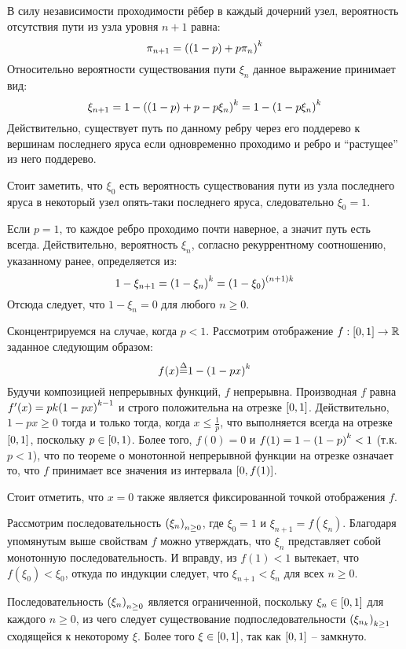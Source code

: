 \documentclass[a4paper]{article}
\let\originalleft\left
\let\originalright\right
\renewcommand{\left}{\mathopen{}\mathclose\bgroup\originalleft}
\renewcommand{\right}{\aftergroup\egroup\originalright}
\newcommand{\clo}[1]{{\left [ #1 \right ]}}
\newcommand{\clop}[1]{{\left [ #1 \right )}}
\newcommand{\brac}[1]{{\left ( #1 \right )}}
\newcommand{\Real}{{\mathbb{R}}}
\newcommand{\defn}{{\mathop{\overset{\Delta}{=}}\nolimits}}
\begin{document}
В силу независимости проходимости рёбер в каждый дочерний узел, вероятность
отсутствия пути из узла уровня $n+1$ равна:
\[ \pi_{n+1} = \brac{ ( 1 - p ) + p \pi_n }^k\]
Относительно вероятности существования пути $\xi_n$ данное выражение принимает
вид:
\[ \xi_{n+1} = 1 - \brac{ ( 1 - p ) + p - p \xi_n }^k = 1 - \brac{ 1 - p \xi_n }^k\]
Действительно, существует путь по данному ребру через его поддерево к вершинам
последнего яруса если одновременно проходимо и ребро и ``растущее'' из него
поддерево.

Стоит заметить, что $\xi_0$ есть вероятность существования пути из узла
последнего яруса в некоторый узел опять-таки последнего яруса, следовательно
$\xi_0 = 1$.

Если $p = 1$, то каждое ребро проходимо почти наверное, а значит путь есть
всегда. Действительно, вероятность $\xi_n$, согласно рекуррентному соотношению,
указанному ранее, определяется из:
\[1-\xi_{n+1} = \brac{ 1-\xi_n }^k = \brac{ 1-\xi_0 }^{(n+1)k}\]
Отсюда следует, что $1-\xi_n=0$ для любого $n\geq0$.

Сконцентрируемся на случае, когда $p<1$. Рассмотрим отображение
$f:\clo{0,1}\to \Real$ заданное следующим образом:
\[f(x) \defn 1 - \brac{ 1 - p x}^k\]
Будучи композицией непрерывных функций, $f$ непрерывна.
Производная $f$ равна $f'(x) = p k \brac{1 - p x}^{k-1}$ и строго положительна
на отрезке $\clo{0,1}$.
Действительно, $1 - p x\geq 0$ тогда и только тогда, когда $x\leq \frac{1}{p}$,
что выполняется всегда на отрезке $\clo{0,1}$, поскольку $p\in\clop{0,1}$.
Более того, $f(0) = 0$ и $f(1) = 1 - \brac{1-p}^k < 1$ (т.к. $p<1$), что по
теореме о монотонной непрерывной функции на отрезке означает то, что $f$
принимает все значения из интервала $\clo{0,f(1)}$.

Стоит отметить, что $x=0$ также является фиксированной точкой отображения $f$.

Рассмотрим последовательность $\brac{\xi_n}_{n\geq 0}$, где $\xi_0 = 1$ и 
$\xi_{n+1} = f(\xi_n)$.
Благодаря упомянутым выше свойствам $f$ можно утверждать, что $\xi_n$
представляет собой монотонную последовательность.
И вправду, из $f(1) < 1$ вытекает, что $f(\xi_0)<\xi_0$, откуда по индукции
следует, что $\xi_{n+1}<\xi_n$ для всех $n\geq 0$.

Последовательность $\brac{\xi_n}_{n\geq0}$ является ограниченной, поскольку
$\xi_n\in\clo{0,1}$ для каждого $n\geq 0$, из чего следует существование
подпоследовательности $\brac{\xi_{n_k}}_{k\geq 1}$ сходящейся к некоторому
$\xi$.
Более того $\xi\in \clo{0,1}$, так как $\clo{0,1}$ -- замкнуто.
\end{document}
